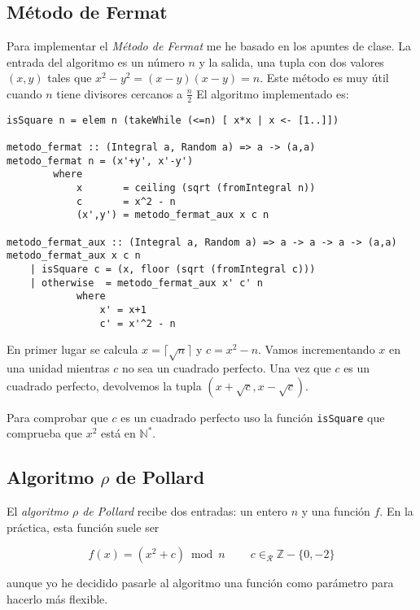 \documentclass[10pt,spanish]{article}
\begin{document}
\subsection{\textcolor{rojo}Método de Fermat}
Para implementar el \textit{\textcolor{rojo}{Método de Fermat}} me he basado en los apuntes de clase. La entrada del algoritmo es un número $n$ y la salida, una tupla con dos valores $(x,y)$ tales que $x^2 - y^2 = (x-y)(x-y) = n$. Este método es muy útil cuando $n$ tiene divisores cercanos a $\frac{n}{2}$ El algoritmo implementado es:

\begin{verbatim}
isSquare n = elem n (takeWhile (<=n) [ x*x | x <- [1..]])

metodo_fermat :: (Integral a, Random a) => a -> (a,a)
metodo_fermat n = (x'+y', x'-y')
        where
            x       = ceiling (sqrt (fromIntegral n))
            c       = x^2 - n
            (x',y') = metodo_fermat_aux x c n

metodo_fermat_aux :: (Integral a, Random a) => a -> a -> a -> (a,a)
metodo_fermat_aux x c n
    | isSquare c = (x, floor (sqrt (fromIntegral c)))
    | otherwise  = metodo_fermat_aux x' c' n
            where
                x' = x+1
                c' = x'^2 - n
\end{verbatim}

En primer lugar se calcula $x = \lceil \sqrt{n} \rceil$ y $c = x^2 - n$. Vamos incrementando $x$ en una unidad mientras $c$ no sea un cuadrado perfecto. Una vez que $c$ es un cuadrado perfecto, devolvemos la tupla $(x + \sqrt{c}, x - \sqrt{c})$.

Para comprobar que $c$ es un cuadrado perfecto uso la función \texttt{isSquare} que comprueba que $x^2$ está en $\mathbb{N}^{\ast}$.

\subsection{\textcolor{rojo}Algoritmo $\rho$ de Pollard}
El \textit{\textcolor{rojo}{algoritmo $\rho$ de Pollard}} recibe dos entradas: un entero $n$ y una función $f$. En la práctica, esta función suele ser

\begin{displaymath}
    f(x) = (x^2 + c) \bmod n \qquad\ c \in_\mathcal{R} \mathbb{Z} - \{0, -2\}
\end{displaymath}

aunque yo he decidido pasarle al algoritmo una función como parámetro para hacerlo más flexible.
\end{document}
